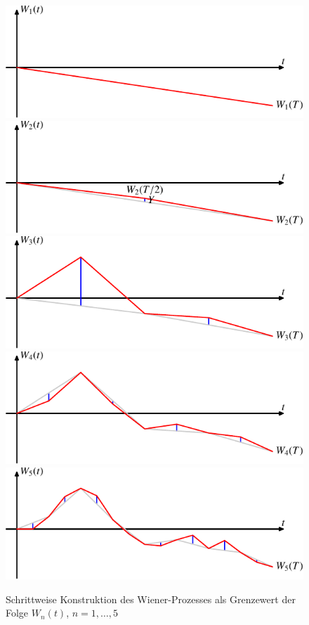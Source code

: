 \begin{figure}
\centering
\includegraphics{chapters/images/stochastisch-3.pdf}\\
\includegraphics{chapters/images/stochastisch-4.pdf}\\
\includegraphics{chapters/images/stochastisch-5.pdf}\\
\includegraphics{chapters/images/stochastisch-6.pdf}\\
\includegraphics{chapters/images/stochastisch-7.pdf}
\caption{Schrittweise Konstruktion des Wiener-Prozesses als Grenzewert
der Folge $W_n(t)$, $n=1,\dots,5$
\label{stochastisch:folge1}}
\end{figure}
